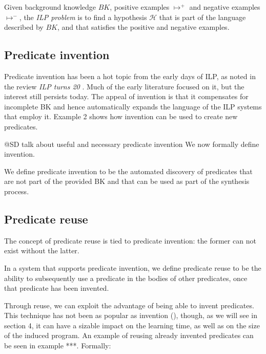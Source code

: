 \begin{defn}
Given background knowledge $BK$, positive examples $\mapsto^+$ and negative examples $\mapsto^-$, the \emph{ILP problem} is to find a hypothesis $\mathcal{H}$ that is part of the language described by $BK$, and that satisfies the positive and negative examples.
\end{defn}

\subsection{Predicate invention}
Predicate invention has been a hot topic from the early days of ILP, as noted in the review \textit{ILP turns 20} \cite{ilpturns20}. Much of the early literature focused on it, but the interest still persists today. The appeal of invention is that it compensates for incomplete BK and hence automatically expands the language of the ILP systems that employ it. Example 2 shows how invention can be used to create new predicates.

\begin{example}[Invention]

\end{example}
\ac{@SD talk about useful and necessary predicate invention}
We now formally define invention.
\begin{defn}[Invention]
We define predicate invention to be the automated discovery of predicates that are not part of the provided BK and that can be used as part of the synthesis process.
\end{defn}

\subsection{Predicate reuse}
The concept of predicate reuse is tied to predicate invention: the former can not exist without the latter.

\begin{defn}[Reuse]
In a system that supports predicate invention, we define predicate reuse to be the ability to subsequently use a predicate in the bodies of other predicates, once that predicate has been invented.
\end{defn}

Through reuse, we can exploit the advantage of being able to invent predicates. This technique has not been as popular as invention (), though, as we will see in section 4, it can have a sizable impact on the learning time, as well as on the size of the induced program. An example of reusing already invented predicates can be seen in example ***. Formally:
